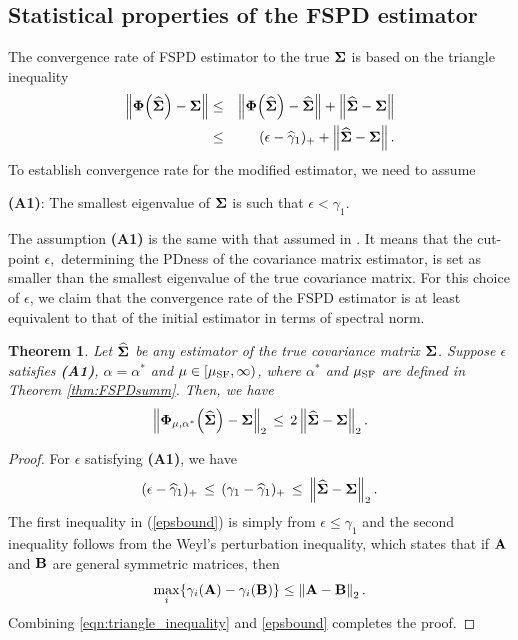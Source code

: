 \documentclass[times,sort&compress,3p]{elsarticle}
\newcommand{\NN}{\nonumber}
\newtheorem{theorem}{Theorem}
\begin{document}
\subsection{Statistical properties of the FSPD estimator}\label{subsec:convrate}

The convergence rate of
FSPD estimator to the true ${\bf \Sigma}$ is based on the triangle inequality
\begin{eqnarray}
\left\|{\bf \Phi}\Big(\widehat{\bf \Sigma}\Big) - {\bf \Sigma}\right\|
	&\leq&
	\left\|{\bf \Phi}\Big(\widehat{\bf \Sigma}\Big) - \widehat{\bf \Sigma}\right\| +
	\left\|\widehat{\bf \Sigma} - {\bf \Sigma}\right\| \NN \\
&\leq& (\epsilon - \widehat{\gamma}_{1})_+ +
	\left\|\widehat{\bf \Sigma} - {\bf \Sigma}\right\|.
\label{eqn:triangle_inequality}
\end{eqnarray}
To establish convergence rate for the modified estimator, we need to assume 

\begin{center}
\vspace{-0.0cm}
 {\bf (A1)}:  The smallest eigenvalue of $\bf \Sigma$ is such that $\epsilon < {\gamma}_{1}$.
\end{center}

\vspace{-0.0cm}
\noindent The assumption {\bf (A1)} is the same with that assumed  in \citet{Xue2012}. It  means that the cut-point $\epsilon,$ determining the PDness of the covariance matrix estimator, is set as smaller than the smallest eigenvalue of the true covariance matrix. For this choice of $\epsilon$, we claim that the convergence rate of the FSPD estimator is at least equivalent to that of the initial estimator in terms of spectral norm. 

\begin{theorem}\label{prop:FSPDcov1} 
Let $\widehat{\bf \Sigma}$ be any estimator of the true covariance matrix ${\bf \Sigma}$. Suppose 
$\epsilon$ satisfies {\bf (A1)}, $\alpha=\alpha^*$ and $\mu \in [\mu_{\rm SF}, \infty)$, 
where $\alpha^*$ and $\mu_{\rm SF}$
are defined in Theorem \ref{thm:FSPDsumm}. Then,  we have   
\[
\left\| {\bf \Phi}_{\mu, \alpha^*}\Big(\widehat{\bf \Sigma}\Big) - {\bf \Sigma} \right\|_2 \,\leq\,  
	2\left\| \widehat{\bf \Sigma} - {\bf \Sigma} \right\|_2.
\]
\end{theorem}
\begin{proof}
For $\epsilon$ satisfying {\bf (A1)}, we have
\begin{equation}\label{epsbound}
(\epsilon - \widehat{\gamma}_{1})_+ \,\leq\, ({\gamma}_{1} - \widehat{\gamma}_{1})_+
\,\leq\, \left\|\widehat{\bf \Sigma} - {\bf \Sigma}\right\|_2.
\end{equation}
 The first inequality in (\ref{epsbound})
is simply from $\epsilon \leq {\gamma}_{1}$ and  the second inequality follows from the Weyl's perturbation inequality, which states that if  ${\bf A}$ and ${\bf B}$  are general symmetric 
matrices, then 
\[
\max_i \{ \gamma_i({\bf A}) - \gamma_i({\bf B}) \} \leq \left\|{\bf A} - {\bf B}\right\|_2.
\]
Combining \eqref{eqn:triangle_inequality} and \eqref{epsbound} completes the proof.
\end{proof}
\end{document}
